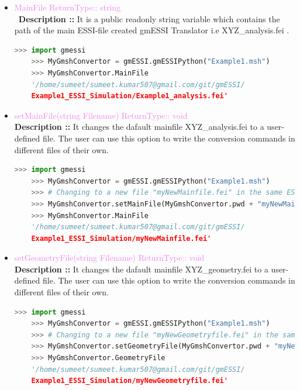 \documentclass[11pt]{article}
\begin{document}
\begin{itemize}
    \item \textcolor{violet}{MainFile \hfill {ReturnType:: string}} \\\
    \textbf{Description ::} It is a public readonly string variable which contains the path of the main ESSI-file created gmESSI Translator i.e XYZ\_analysis.fei . 
    \begin{lstlisting}[language=Python]
    >>> import gmessi
    >>> MyGmshConvertor = gmESSI.gmESSIPython("Example1.msh")
    >>> MyGmshConvertor.MainFile
    '/home/sumeet/sumeet.kumar507@gmail.com/git/gmESSI/
    Example1_ESSI_Simulation/Example1_analysis.fei'
    \end{lstlisting}

    \item \textcolor{violet}{setMainFile(string Filename) \hfill {ReturnType:: void}} \\
    \textbf{Description ::} It changes the dafault mainfile XYZ\_analysis.fei to a user-defined file. The user can use this option to write the conversion commands in different files of their own.
    \begin{lstlisting}[language=Python]
    >>> import gmessi
    >>> MyGmshConvertor = gmESSI.gmESSIPython("Example1.msh")
    >>> # Changing to a new file "myNewMainfile.fei" in the same ESSI_Simulation_Folder
    >>> MyGmshConvertor.setMainFile(MyGmshConvertor.pwd + "myNewMainfile.fei") 
    >>> MyGmshConvertor.MainFile
    '/home/sumeet/sumeet.kumar507@gmail.com/git/gmESSI/
    Example1_ESSI_Simulation/myNewMainfile.fei'
    \end{lstlisting}

    \item \textcolor{violet}{ setGeometryFile(string Filename) \hfill {ReturnType:: void}} \\ 
    \textbf{Description ::} It changes the dafault mainfile XYZ\_geometry.fei to a user-defined file. The user can use this option to write the conversion commands in different files of their own.
    \begin{lstlisting}[language=Python]
    >>> import gmessi
    >>> MyGmshConvertor = gmESSI.gmESSIPython("Example1.msh")
    >>> # Changing to a new file "myNewGeometryfile.fei" in the same ESSI_Simulation_Folder
    >>> MyGmshConvertor.setGeometryFile(MyGmshConvertor.pwd + "myNewGeometryfile.fei") 
    >>> MyGmshConvertor.GeometryFile
    '/home/sumeet/sumeet.kumar507@gmail.com/git/gmESSI/
    Example1_ESSI_Simulation/myNewGeometryfile.fei'
    \end{lstlisting}


\end{itemize}
\end{document}
